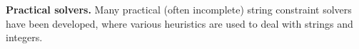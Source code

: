 {%
\smallskip
\noindent
\textbf{Practical solvers.}
%
%
%
%
% 
Many practical (often incomplete) string constraint solvers have been developed, where various heuristics are used to deal with strings and integers. 

}

